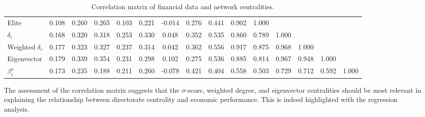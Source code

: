 \begin{table}[t!]
\begin{onehalfspace}
{\begin{tabular}{@{\extracolsep{5pt}} lcccccccccccccc}
Elite                                                         & 0.108  & 0.260                                                         & 0.265  & 0.103    & 0.221                                                       & -0.014 & 0.276     & 0.441 & 0.902        & 1.000 &              &                                                                 &             &             \\
$\delta_{i}$                                                  & 0.168  & 0.320                                                         & 0.318  & 0.253    & 0.330                                                       & 0.048  & 0.352     & 0.535 & 0.860        & 0.789 & 1.000        &                                                                 &             &             \\
Weighted $\delta_{i}$                                         & 0.177  & 0.323                                                         & 0.327  & 0.237    & 0.314                                                       & 0.042  & 0.362     & 0.556 & 0.917        & 0.875 & 0.968        & 1.000                                                           &             &             \\
Eigenvector                                                   & 0.179  & 0.339                                                         & 0.354  & 0.231    & 0.298                                                       & 0.102  & 0.275     & 0.536 & 0.885        & 0.814 & 0.967        & 0.948                                                           & 1.000       &             \\
$\beta^{\star}_{i}$                                                   & 0.173  & 0.235                                                         & 0.188  & 0.211    & 0.260                                                       & -0.078 & 0.421     & 0.404 & 0.558        & 0.503 & 0.729        & 0.712                                                           & 0.592       & 1.000       \\
\bottomrule
\end{tabular}
}
\caption{Correlation matrix of financial data and network centralities.}
\label{fin-corr}
\end{onehalfspace}
\end{table}


The assessment of the correlation matrix suggests that the $\sigma$-score, weighted degree, and eigenvector centralities should be most relevant in explaining the relationship between directorate centrality and economic performance. This is indeed highlighted with the regression analysis.

